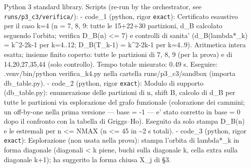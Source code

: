 Python 3 standard library. Scripts (re-run by the orchestrator, see
\texttt{runs/p3\_c3/verifica/}): - code\_1 (python, rigor
\texttt{exact}): Certificato esaustivo per il caso k=4 (n = 7, 8, 9:
tutte le 15+22+30 partizioni, d\_B calcolato seguendo l'orbita; verifica
D\_B(n) \textless= 7) e controlli di sanita' (d\_B(lambda*\_k) =
k\^{}2-2k-1 per k=4..12; D\_B(T\_k-1) = k\^{}2-2k-1 per k=4..9).
Aritmetica intera esatta; insieme finito coperto: tutte le partizioni di
7, 8, 9 (per la prova) e di 14,20,27,35,44 (solo controllo). Tempo
totale misurato: 0.49 s. Eseguire: .venv/bin/python verifica\_k4.py
nella cartella runs/p3\_c3/sandbox (importa db\_table.py). - code\_2
(python, rigor \texttt{exact}): Modulo di supporto (db\_table.py):
enumerazione delle partizioni di n, shift B, calcolo di d\_B per tutte
le partizioni via esplorazione del grafo funzionale (colorazione dei
cammini; un off-by-one nella prima versione --- base = -1 --- e' stato
corretto in base = 0 dopo il confronto con la tabella di Griggs--Ho).
Eseguito da solo stampa D\_B(n) e le estremali per n \textless= NMAX (n
\textless= 45 in \textasciitilde2 s totali). - code\_3 (python, rigor
\texttt{exact}): Esplorazione (non usata nella prova): stampa l'orbita
di lambda*\_k in forma diagonale (diagonali \textless{} k piene, buchi
sulla diagonale k, cella extra sulla diagonale k+1); ha suggerito la
forma chiusa X\_j di §3.


